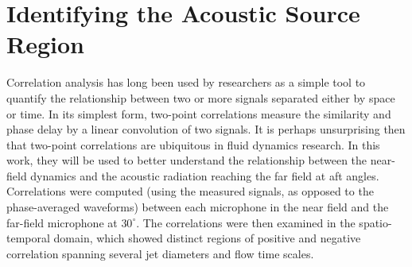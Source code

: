 \section{Identifying the Acoustic Source Region}
\label{sect:near_field_source_region}
Correlation analysis has long been used by researchers as a simple tool to quantify the relationship between two or more signals separated either by space or time.
In its simplest form, two-point correlations measure the similarity and phase delay by a linear convolution of two signals.
It is perhaps unsurprising then that two-point correlations are ubiquitous in fluid dynamics research.
In this work, they will be used to better understand the relationship between the near-field dynamics and the acoustic radiation reaching the far field at aft angles.
Correlations were computed (using the measured signals, as opposed to the phase-averaged waveforms) between each microphone in the near field and the far-field microphone at $30^\circ$. 
The correlations were then examined in the spatio-temporal domain, which showed distinct regions of positive and negative correlation spanning several jet diameters and flow time scales.
